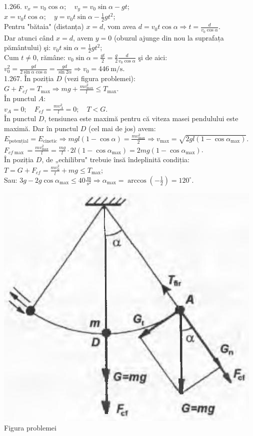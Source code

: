 1.266. $v_{x}=v_{0} \cos \alpha; \quad v_{y}=v_{0} \sin \alpha-g t$;\\ $x=v_{0} t \cos \alpha; \quad y=v_{0} t \sin \alpha-\frac{1}{2} g t^{2}$;\\ Pentru "bătaia" (distanța) $x=d$, vom avea $d=v_{0} t \cos \alpha \Rightarrow t=\frac{d}{v_{0} \cos \alpha}$.\\ Dar atunci când  $x=d$, avem $y=0$ (obuzul ajunge din nou la suprafața pământului) şi: $v_{0} t \sin \alpha=\frac{1}{2} g t^{2}$;\\ Cum $t \neq 0$, rămâne: $v_{0} \sin \alpha=\frac{g t}{2}=\frac{g}{2} \frac{d}{v_{0} \cos \alpha}$ şi de aici:\\ $v_{0}^{2}=\frac{g d}{2 \sin \alpha \cos \alpha}=\frac{g d}{\sin 2 \alpha} \Rightarrow v_{0}=446 \mathrm{~m} / \mathrm{s}$.\\

1.267. În poziția $D$ (vezi figura problemei):\\ $G+F_{c f}=T_{\max} \Rightarrow m g+\frac{m v_{\max}^{2}}{l} \leq T_{\max}$.\\ În punctul $A$:\\ $v_{A}=0; \quad F_{c f}=\frac{m v_{A}^{2}}{l}=0; \quad T<G$.\\ În punctul $D$, tensiunea este maximă pentru că viteza masei pendulului este maximă. Dar în punctul $D$ (cel mai de jos) avem:\\ $E_{\text {potențial}}=E_{\text {cinetic}} \Rightarrow m g l(1-\cos \alpha)=\frac{m v_{\max}^{2}}{2} \Rightarrow v_{\max}=\sqrt{2 g l\left(1-\cos \alpha_{\max}\right)}$.\\ $F_{c f \max}=\frac{m v_{\max}^{2}}{l}=\frac{m g}{l} \cdot 2 l\left(1-\cos \alpha_{\max}\right)=2 m g\left(1-\cos \alpha_{\max}\right)$.\\ În poziția $D$, de „echilibru" trebuie însă îndeplinită condiția:\\ $T=G+F_{c f}=\frac{m v_{0}^{2}}{l}+m g \leq T_{\max}$;\\ Sau: $3 g-2 g \cos \alpha_{\max} \leq 40 \frac{\mathrm{~m}}{\mathrm{~s}^{2}} \Rightarrow \alpha_{\max}=\arccos \left(-\frac{1}{2}\right)=120^{\circ}$.\\ \begin{center} \includegraphics[width=0.4\linewidth]{images/2025_07_01_5b3ff9fa0d508c8e9f17g-256}\\ Figura problemei \end{center}\\

